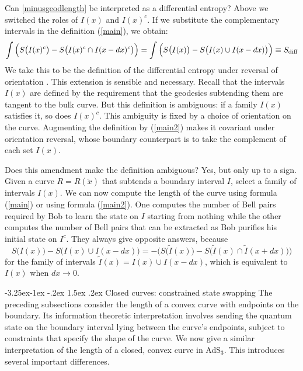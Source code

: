 \documentclass[12pt]{article}
\makeatletter
\renewcommand\subsection{\@startsection{subsection}{2}{\z@}%
                                     {-3.25ex\@plus -1ex \@minus -.2ex}%
                                     {1.5ex \@plus .2ex}%
                                     {\normalfont\bfseries}}
\def\sdiff{S_{\rm diff}}
\makeatother
\begin{document}
Can \eqref{minusgeodlength} be interpreted as a differential entropy? Above we switched the roles of $I(x)$ and $I(x)^c$. If we substitute the complementary intervals in the definition (\ref{main}), we obtain:
\begin{equation}
\int \Big(S\big(I(x)^c\big) - S\big(I(x)^c \cap I(x-dx)^c\big) \Big) =
\int \Big(S\big(I(x)\big) - S\big(I(x) \cup I(x-dx)\big) \Big) \equiv \sdiff
\label{main2}
\end{equation}
We take this to be the definition of the differential entropy under reversal of orientation \cite{roblast, robproof, lampros}. This extension is sensible and necessary. Recall that the intervals $I(x)$ are defined by the requirement that the geodesics subtending them are tangent to the bulk curve. But this definition is ambiguous: if a family $I(x)$ satisfies it, so does $I(x)^c$. This ambiguity is fixed by a choice of orientation on the curve. Augmenting the definition by (\ref{main2}) makes it covariant under orientation reversal, whose boundary counterpart is to take the complement of each set $I(x)$.

Does this amendment make the definition ambiguous? Yes, but only up to a sign. Given a curve $R = R(\tilde{x})$ that subtends a boundary interval $I$, select a family of intervals $I(x)$. We can now compute the length of the curve using formula (\ref{main}) or using formula (\ref{main2}). One computes the number of Bell pairs required by Bob to learn the state on $I$ starting from nothing while the other computes the number of Bell pairs that can be extracted as Bob purifies his initial state on $I^c$. They always give opposite answers, because
\begin{equation}
S\big(I(x)\big) - S\big(I(x) \cup I(x-dx)\big) = - \Big( S\big(\tilde{I}(x)\big) - S\big( \tilde{I}(x) \cap \tilde{I}(x+dx) \big) \Big)
\label{sumdiff}
\end{equation}
for the family of intervals $\tilde{I}(x) = I(x) \cup I(x-dx)$, which is equivalent to $I(x)$ when $dx \to 0$.

\subsection{Closed curves: constrained state swapping}
\label{swapprotocol}
The preceding subsections consider the length of a convex curve with endpoints on the boundary. Its information theoretic interpretation involves sending the quantum state on the boundary interval lying between the curve's endpoints, subject to constraints that specify the shape of the curve. We now give a similar interpretation of the length of a closed, convex curve in AdS$_3$. This introduces several important differences.
\end{document}
